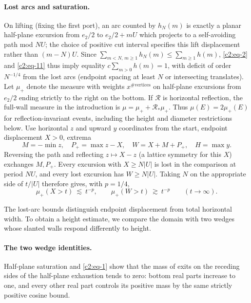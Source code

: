 \paragraph{Lost arcs and saturation.}
On lifting (fixing the first port), an arc counted by \(h_N(m)\) is exactly a planar half-plane excursion from \(e_2/2\) to \(e_2/2+m U\) which projects to a self-avoiding path mod \(N U\); the choice of positive cut interval specifies this lift displacement rather than \((m-N)U\). Since \(\sum_{m<N,\,m\ge1} h_N(m)\le\sum_{m\ge1}h(m)\), \eqref{c2:eq-2} and \eqref{c2:eq-11} thus imply equality \(c\sum_{m>0}h(m)=1\), with deficit of order \(N^{-1/4}\) from the lost arcs (endpoint spacing at least \(N\) or intersecting translates). Let \(\mu_+\) denote the measure with weights \(x^{\#\mathrm{vertices}}\) on half-plane excursions from \(e_2/2\) ending strictly to the right on the bottom. If $\mathcal R$ is horizontal reflection, the full-wall measure in the introduction is $\mu=\mu_++\mathcal R_*\mu_+$.  Thus $\mu(E)=2\mu_+(E)$ for reflection-invariant events, including the height and diameter restrictions below.  Use horizontal \(z\) and upward \(y\) coordinates from the start, endpoint displacement \(X>0\), extrema
\[
 M=-\min z,\quad P_+=\max z-X,\quad W=X+M+P_+,\quad H=\max y.
\]
Reversing the path and reflecting \(z\mapsto X-z\) (a lattice symmetry for this \(X\)) exchanges \(M,P_+\). Every excursion with \(X\ge N|U|\) is lost in the comparison at period \(N U\), and every lost excursion has \(W\ge N|U|\). Taking \(N\) on the appropriate side of \(t/|U|\) therefore gives, with \(p=1/4\),
\begin{equation}
 \mu_+(X>t)\ \lesssim\ t^{-p},\qquad \mu_+(W>t)\ \gtrsim\ t^{-p}\qquad(t\to\infty). \label{c2:eq-12}
\end{equation}

The lost-arc bounds distinguish endpoint displacement from total
horizontal width.  To obtain a height estimate, we compare the domain
with two wedges whose slanted walls respond differently to height.

\paragraph{The two wedge identities.}
Half-plane saturation and \eqref{c2:eq-1} show that the mass of exits on
the receding sides of the half-plane exhaustion tends to zero: bottom
real parts increase to one, and every other real part controls its
positive mass by the same strictly positive cosine bound.

